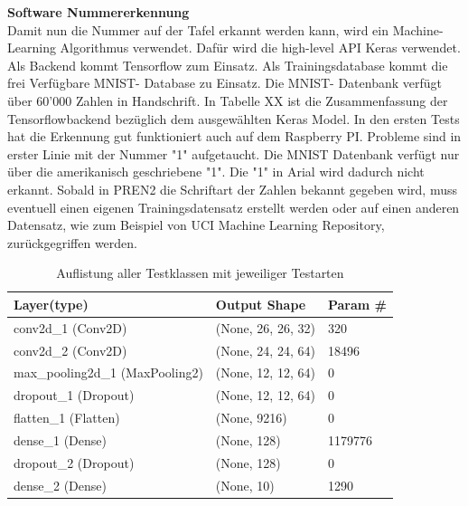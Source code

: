 \documentclass[../../main.tex]{subfiles}
\begin{document}
    \textbf{Software Nummererkennung}\\
    Damit nun die Nummer auf der Tafel erkannt werden kann, wird ein Machine- Learning Algorithmus verwendet. Dafür wird die high-level API Keras verwendet. Als Backend kommt Tensorflow zum Einsatz. Als Trainingsdatabase kommt die frei Verfügbare MNIST- Database zu Einsatz. Die MNIST- Datenbank verfügt über 60'000 Zahlen in Handschrift. In Tabelle XX ist die Zusammenfassung der Tensorflowbackend bezüglich dem ausgewählten Keras Model. In den ersten Tests hat die Erkennung gut funktioniert auch auf dem Raspberry PI. Probleme sind in erster Linie mit der Nummer "1" aufgetaucht. Die MNIST Datenbank verfügt nur über die amerikanisch geschriebene "1". Die "1" in Arial wird dadurch nicht erkannt. Sobald in PREN2 die Schriftart der Zahlen bekannt gegeben wird, muss eventuell einen eigenen Trainingsdatensatz erstellt werden oder auf einen anderen Datensatz, wie zum Beispiel von UCI Machine Learning Repository, zurückgegriffen werden.
    \begin{table}[H]
            \begin{center}
                \begin{tabular}{ | l | l | p{3cm} |}
                \hline
                \textbf{Layer(type)}  & \textbf{Output Shape} & \textbf{Param \#}\\\hline
                conv2d\_1 (Conv2D) & (None, 26, 26, 32) & 320 \\\hline
                conv2d\_2 (Conv2D) & (None, 24, 24, 64) & 18496 \\ \hline
                max\_pooling2d\_1 (MaxPooling2) & (None, 12, 12, 64) & 0\\ \hline
                dropout\_1 (Dropout) & (None, 12, 12, 64) & 0 \\ \hline
                flatten\_1 (Flatten) & (None, 9216) & 0 \\ \hline
                dense\_1 (Dense) & (None, 128) & 1179776 \\ \hline
                dropout\_2 (Dropout)  & (None, 128) & 0 \\ \hline
                dense\_2 (Dense)  & (None, 10) & 1290 \\ \hline
                \end{tabular}
            \end{center}
            \caption{Auflistung aller Testklassen mit jeweiliger Testarten}
            \label{tab:Testklassen}
        \end{table}
\end{document}
